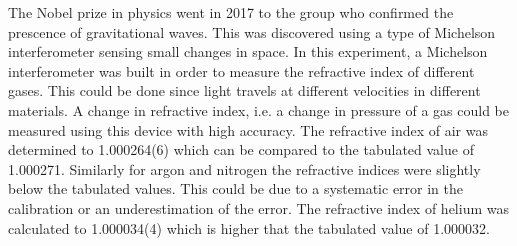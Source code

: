 The Nobel prize in physics went in 2017 to the group who confirmed the prescence of gravitational waves. This was discovered using a type of Michelson interferometer sensing small changes in space. In this experiment, a Michelson interferometer was built in order to measure the refractive index of different gases. This could be done since light travels at different velocities in different materials. A change in refractive index, i.e. a change in pressure of a gas could be measured using this device with high accuracy. The refractive index of air was determined to 1.000264(6) which can be compared to the tabulated value of 1.000271. Similarly for argon and nitrogen the refractive indices were slightly below the tabulated values. This could be due to a systematic error in the calibration or an underestimation of the error. The refractive index of helium was calculated to 1.000034(4) which is higher that the tabulated value of 1.000032.
